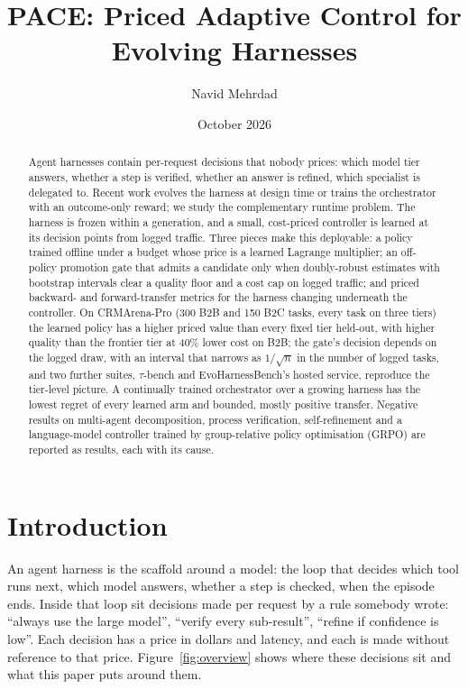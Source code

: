 \documentclass[10pt]{article}
\title{\textbf{PACE: Priced Adaptive Control for Evolving Harnesses}}
\author{Navid Mehrdad}
\date{October 2026}
\begin{document}
\maketitle

\begin{abstract}
Agent harnesses contain per-request decisions that nobody prices: which model tier answers, whether a step is verified, whether an answer is refined, which specialist is delegated to. Recent work evolves the harness at design time or trains the orchestrator with an outcome-only reward; we study the complementary runtime problem. The harness is frozen within a generation, and a small, cost-priced controller is learned at its decision points from logged traffic. Three pieces make this deployable: a policy trained offline under a budget whose price is a learned Lagrange multiplier; an off-policy promotion gate that admits a candidate only when doubly-robust estimates with bootstrap intervals clear a quality floor and a cost cap on logged traffic; and priced backward- and forward-transfer metrics for the harness changing underneath the controller. On CRMArena-Pro (300 B2B and 150 B2C tasks, every task on three tiers) the learned policy has a higher priced value than every fixed tier held-out, with higher quality than the frontier tier at 40\% lower cost on B2B; the gate's decision depends on the logged draw, with an interval that narrows as $1/\sqrt{n}$ in the number of logged tasks, and two further suites, $\tau$-bench and EvoHarnessBench's hosted service, reproduce the tier-level picture. A continually trained orchestrator over a growing harness has the lowest regret of every learned arm and bounded, mostly positive transfer. Negative results on multi-agent decomposition, process verification, self-refinement and a language-model controller trained by group-relative policy optimisation (GRPO) are reported as results, each with its cause.
\end{abstract}

\section{Introduction}
\label{sec:intro}

An agent harness is the scaffold around a model: the loop that decides which tool runs next, which model answers, whether a step is checked, when the episode ends. Inside that loop sit decisions made per request by a rule somebody wrote: ``always use the large model'', ``verify every sub-result'', ``refine if confidence is low''. Each decision has a price in dollars and latency, and each is made without reference to that price. Figure~\ref{fig:overview} shows where these decisions sit and what this paper puts around them.
\end{document}

